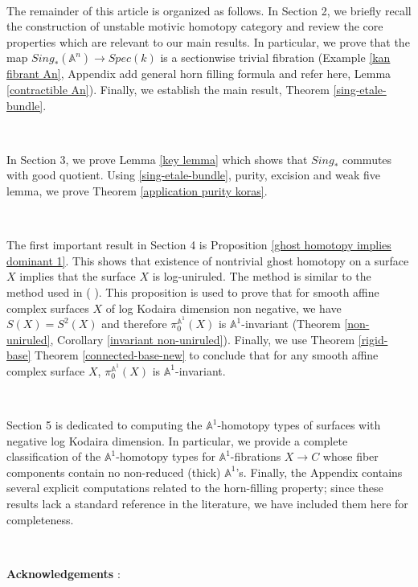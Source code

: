 \documentclass[11pt, reqno]{amsart}
\theoremstyle{plain}
\theoremstyle{definition}
\begin{document}
\

The remainder of this article is organized as follows. In Section 2,  we briefly recall the construction of unstable motivic homotopy category and review the core properties which are relevant to our main results. In particular, we prove that the map  $Sing_*(\mathbb{A}^n) \to Spec(k)$ is a sectionwise trivial fibration (Example \ref{kan fibrant An}, Appendix add general horn filling formula and refer here, Lemma \ref{contractible An}). Finally, we establish the main result,  Theorem \ref{sing-etale-bundle}.

\

In Section 3,  we prove Lemma \ref{key lemma} which shows that $Sing_*$ commutes with good quotient.  Using \ref{sing-etale-bundle}, purity, excision and weak five lemma,  we prove
Theorem  \ref{application purity koras}.


\

The first important result in Section 4 is Proposition \ref{ghost homotopy implies dominant 1}. This shows that existence of nontrivial ghost homotopy on a surface $X$ implies that the surface $X$ is log-uniruled. The method is similar to the method used in (\cite{cb} \cite{choudhury2}).
This proposition is used to prove that for smooth affine complex surfaces $X$ of log Kodaira dimension non negative, we have $S(X) = S^2(X)$ and therefore $\pi_0^{\mathbb{A}^1}(X)$ is $\mathbb{A}^1$-invariant (Theorem \ref{non-uniruled}, Corollary \ref{invariant non-uniruled}). Finally, we use Theorem \ref{rigid-base} Theorem \ref{connected-base-new} to conclude that for any smooth affine complex surface $X$, $\pi_0^{\mathbb{A}^1}(X)$ is $\mathbb{A}^1$-invariant. 

\

Section 5 is dedicated to computing the $\mathbb{A}^1$-homotopy types of surfaces with negative log Kodaira dimension. In particular, we provide a complete classification of the $\mathbb{A}^1$-homotopy types for $\mathbb{A}^1$-fibrations $X \to C$ whose fiber components contain no non-reduced (thick) $\mathbb{A}^1$'s. Finally, the Appendix contains several explicit computations related to the horn-filling property; since these results lack a standard reference in the literature, we have included them here for completeness.


\

\textbf{Acknowledgements} :
\end{document}
